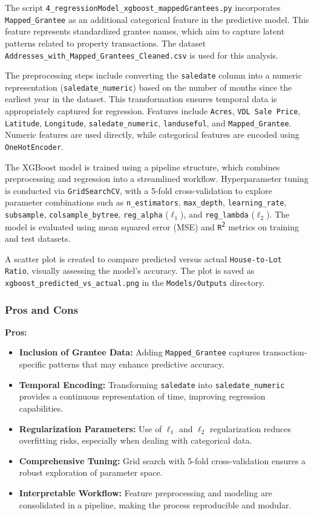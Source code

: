 The script \texttt{4\_regressionModel\_xgboost\_mappedGrantees.py} incorporates \texttt{Mapped\_Grantee} as an additional categorical feature in the predictive model. This feature represents standardized grantee names, which aim to capture latent patterns related to property transactions. The dataset \texttt{Addresses\_with\_Mapped\_Grantees\_Cleaned.csv} is used for this analysis.

The preprocessing steps include converting the \texttt{saledate} column into a numeric representation (\texttt{saledate\_numeric}) based on the number of months since the earliest year in the dataset. This transformation ensures temporal data is appropriately captured for regression. Features include \texttt{Acres}, \texttt{VDL Sale Price}, \texttt{Latitude}, \texttt{Longitude}, \texttt{saledate\_numeric}, \texttt{landuseful}, and \texttt{Mapped\_Grantee}. Numeric features are used directly, while categorical features are encoded using \texttt{OneHotEncoder}.

The XGBoost model is trained using a pipeline structure, which combines preprocessing and regression into a streamlined workflow. Hyperparameter tuning is conducted via \texttt{GridSearchCV}, with a 5-fold cross-validation to explore parameter combinations such as \texttt{n\_estimators}, \texttt{max\_depth}, \texttt{learning\_rate}, \texttt{subsample}, \texttt{colsample\_bytree}, \texttt{reg\_alpha} (\(\ell_1\)), and \texttt{reg\_lambda} (\(\ell_2\)). The model is evaluated using mean squared error (MSE) and \texttt{R\textsuperscript{2}} metrics on training and test datasets.

A scatter plot is created to compare predicted versus actual \texttt{House-to-Lot Ratio}, visually assessing the model’s accuracy. The plot is saved as \texttt{xgboost\_predicted\_vs\_actual.png} in the \texttt{Models/Outputs} directory.

\subsubsection*{Pros and Cons}

\textbf{Pros:}
\begin{itemize}
    \item \textbf{Inclusion of Grantee Data:} Adding \texttt{Mapped\_Grantee} captures transaction-specific patterns that may enhance predictive accuracy.
    \item \textbf{Temporal Encoding:} Transforming \texttt{saledate} into \texttt{saledate\_numeric} provides a continuous representation of time, improving regression capabilities.
    \item \textbf{Regularization Parameters:} Use of \(\ell_1\) and \(\ell_2\) regularization reduces overfitting risks, especially when dealing with categorical data.
    \item \textbf{Comprehensive Tuning:} Grid search with 5-fold cross-validation ensures a robust exploration of parameter space.
    \item \textbf{Interpretable Workflow:} Feature preprocessing and modeling are consolidated in a pipeline, making the process reproducible and modular.
\end{itemize}


